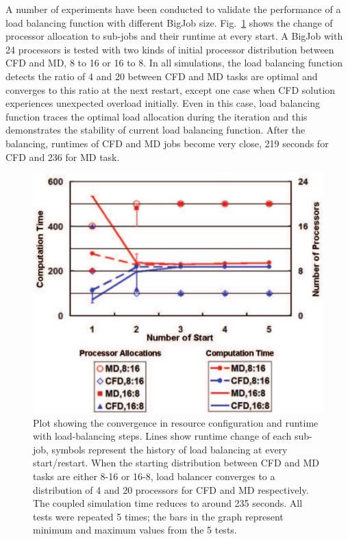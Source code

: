 \documentclass[conference,final]{IEEEtran}
\newcommand{\jhanote}[1]{ {\textcolor{red} { ***Jha: #1 }}}
\newcommand{\jhanote}[1]{}
\begin{document}
A number of experiments have been conducted to validate the performance of a load balancing function with different BigJob size. Fig.~\ref{fig:LB_Graph} shows the change of processor allocation to sub-jobs and their runtime at every start. A BigJob with 24 processors is tested with two kinds of initial processor distribution between CFD and MD, 8 to 16 or 16 to 8. In all simulations, the load balancing function detects the ratio of 4 and 20 between CFD and MD tasks are optimal and converges to this ratio at the next restart, except one case when CFD solution experiences unexpected overload initially. Even in this case, load balancing function traces the optimal load allocation during the iteration and this demonstrates the stability of current load balancing function. After the balancing, runtimes of CFD and MD jobs become very close, 219 seconds for CFD and 236 for MD task.

\begin{figure}
\centering
\includegraphics[scale=0.45]{LB_Graph2}
\caption{\small 
Plot showing the convergence in resource configuration and runtime with load-balancing steps.
Lines show runtime change of each sub-job, symbols represent the history of load balancing at every start/restart. When the
starting distribution between CFD and MD tasks are either 8-16 or 16-8, load balancer converges to a distribution of 4 and 20 processors
for CFD and MD respectively. The coupled simulation time reduces to around 235 seconds. All tests were repeated 5 times; the bars in the graph represent minimum and maximum values from the 5 tests. } %
\label{fig:LB_Graph}
\end{figure}
\end{document}
